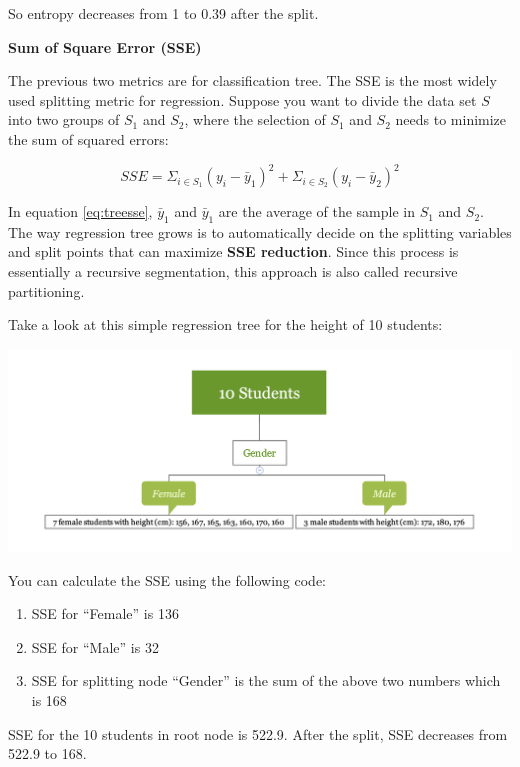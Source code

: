 \documentclass[12pt,]{krantz}
\providecommand{\tightlist}{%
  \setlength{\itemsep}{0pt}\setlength{\parskip}{0pt}}
\begin{document}
So entropy decreases from 1 to 0.39 after the split.

\textbf{Sum of Square Error (SSE)}

The previous two metrics are for classification tree. The SSE is the most widely used splitting metric for regression. Suppose you want to divide the data set \(S\) into two groups of \(S_{1}\) and \(S_{2}\), where the selection of \(S_{1}\) and \(S_{2}\) needs to minimize the sum of squared errors:

\begin{equation}
SSE=\Sigma_{i\in S_{1}}(y_{i}-\bar{y}_{1})^{2}+\Sigma_{i\in S_{2}}(y_{i}-\bar{y}_{2})^{2}
\label{eq:treesse}
\end{equation}

In equation \eqref{eq:treesse}, \(\bar{y}_{1}\) and \(\bar{y}_{1}\) are the average of the sample in \(S_{1}\) and \(S_{2}\). The way regression tree grows is to automatically decide on the splitting variables and split points that can maximize \textbf{SSE reduction}. Since this process is essentially a recursive segmentation, this approach is also called recursive partitioning.

Take a look at this simple regression tree for the height of 10 students:

\includegraphics{images/varEN.png}

You can calculate the SSE using the following code:

\begin{enumerate}
\def\labelenumi{\arabic{enumi}.}
\tightlist
\item
  SSE for ``Female'' is 136
\item
  SSE for ``Male'' is 32
\item
  SSE for splitting node ``Gender'' is the sum of the above two numbers which is 168
\end{enumerate}

SSE for the 10 students in root node is 522.9. After the split, SSE decreases from 522.9 to 168.
\end{document}
